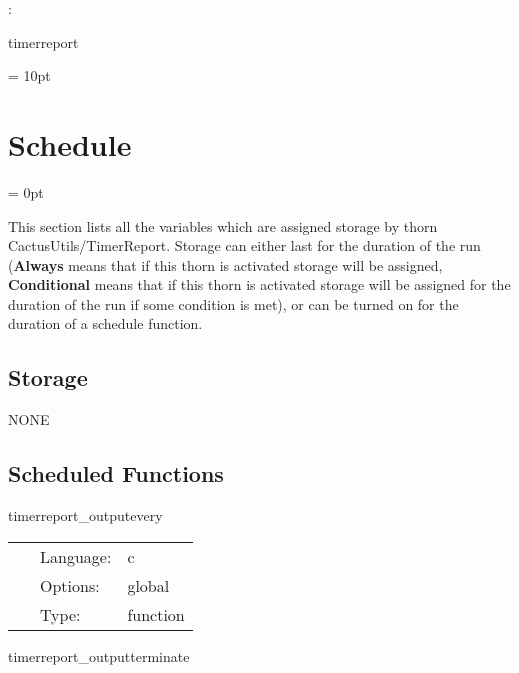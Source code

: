 : 

timerreport
\vspace{2mm}

\vspace{5mm}\parskip = 10pt 

\section{Schedule} 


\parskip = 0pt


\noindent This section lists all the variables which are assigned storage by thorn CactusUtils/TimerReport.  Storage can either last for the duration of the run ({\bf Always} means that if this thorn is activated storage will be assigned, {\bf Conditional} means that if this thorn is activated storage will be assigned for the duration of the run if some condition is met), or can be turned on for the duration of a schedule function.


\subsection*{Storage}NONE
\subsection*{Scheduled Functions}
\vspace{5mm}


\hspace{5mm} timerreport\_outputevery 

\hspace{5mm}{\it print the timer report } 


\hspace{5mm}

 \begin{tabular*}{160mm}{cll} 
~ & Language:  & c \\ 
~ & Options:  & global \\ 
~ & Type:  & function \\ 
\end{tabular*} 


\vspace{5mm}


\hspace{5mm} timerreport\_outputterminate 

\hspace{5mm}{\it print the timer report } 


